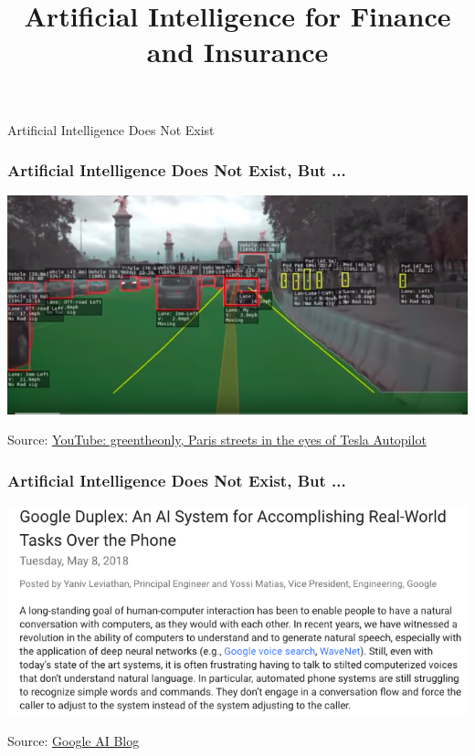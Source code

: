 %
%



\title{Artificial Intelligence for Finance and Insurance}

\maketitle

\begin{frame}[c]
\begin{center}
\huge Artificial Intelligence Does Not Exist
\end{center}
\end{frame}

\begin{frame}
\frametitle{Artificial Intelligence Does Not Exist, But ...}
\includegraphics[width=\textwidth]{figures/tesla_paris}

Source: \href{https://www.youtube.com/watch?v=_1MHGUC_BzQs}{YouTube: greentheonly, Paris streets in the eyes of Tesla Autopilot}
\end{frame}

\begin{frame}
\frametitle{Artificial Intelligence Does Not Exist, But ...}
\includegraphics[width=\textwidth]{figures/google_duplex}

Source: \href{https://ai.googleblog.com/2018/05/duplex-ai-system-for-natural-conversation.html}{Google AI Blog}
\end{frame}

